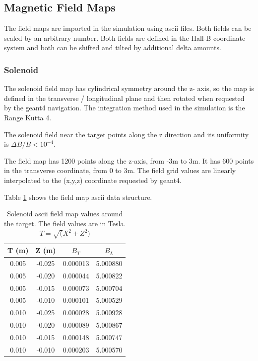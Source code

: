 \subsection{Magnetic Field Maps} \label{clas12FieldMaps}


The field maps are imported in the simulation using ascii files. Both fields can be scaled by an arbitrary number.
Both fields are defined in the Hall-B coordinate system and both can be shifted and tilted by additional delta amounts.

\subsubsection{Solenoid}
The solenoid field map has cylindrical symmetry around the z- axis, so the map is defined in the transverse / longitudinal plane
and then rotated when requested by the geant4 navigation. The integration method used in the simulation is the Range Kutta 4.

The solenoid field near the target points along the z direction and its uniformity is $\Delta B / B < 10^{-4}$.

The field map has 1200 points along the z-axis, from -3m to 3m. It has 600 points in the transverse coordinate, from 0 to 3m.
The field grid values are linearly interpolated to the (x,y,z) coordinate requested by geant4.

Table \ref{tab:solMap} shows the field map ascii data structure.


\begin{table}[h]
	\begin{center}
		\begin{tabular}{| c | c | c | c |}
			T (m)  & Z (m) &  $B_T $  & $ B_L $ \\
			\hline
          0.005  &  -0.025 & 0.000013  & 5.000880 \\
          0.005  &  -0.020 & 0.000044  & 5.000822 \\
          0.005  &  -0.015 & 0.000073  & 5.000704 \\
          0.005  &  -0.010 & 0.000101  & 5.000529 \\
          0.010  &  -0.025 & 0.000028  & 5.000928 \\
          0.010  &  -0.020 & 0.000089  & 5.000867 \\
          0.010  &  -0.015 & 0.000148  & 5.000747 \\
          0.010  &  -0.010 & 0.000203  & 5.000570 \\
		\end{tabular}
	\end{center}
	\caption{Solenoid ascii field map values around the target. The field values are in Tesla. $T=\sqrt(X^2+Z^2)$}\label{tab:solMap}
\end{table}

